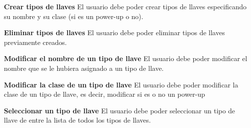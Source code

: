 	\item \textbf{Crear tipos de llaves}\newline
		El usuario debe poder crear tipos de llaves especificando su nombre y su clase (si es un power-up o no).
	\item \textbf{Eliminar tipos de llaves}\newline
		El usuario debe poder eliminar tipos de llaves previamente creados.
	\item \textbf{Modificar el nombre de un tipo de llave}\newline
		El usuario debe poder modificar el nombre que se le hubiera asignado a un tipo de llave.
	\item \textbf{Modificar la clase de un tipo de llave}\newline
		El usuario debe poder modificar la clase de un tipo de llave, es decir, modificar si es o no un power-up
	\item \textbf{Seleccionar un tipo de llave}\newline
		El usuario debe poder seleccionar un tipo de llave de entre la lista de todos los tipos de llaves.
